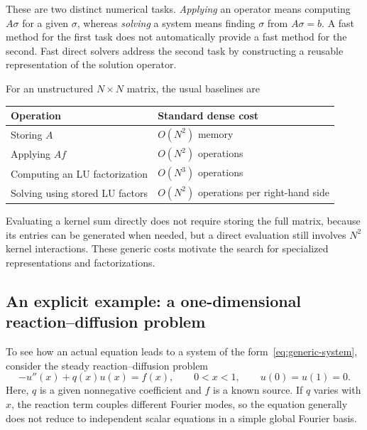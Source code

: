 These are two distinct numerical tasks. \emph{Applying} an operator means computing $A\sigma$ for a given $\sigma$, whereas \emph{solving} a system means finding $\sigma$ from $A\sigma=b$. A fast method for the first task does not automatically provide a fast method for the second. Fast direct solvers address the second task by constructing a reusable representation of the solution operator.

For an unstructured $N\times N$ matrix, the usual baselines are
\begin{center}
\begin{tabular}{@{}ll@{}}
Operation & Standard dense cost \\
\hline
Storing $A$ & $O(N^2)$ memory \\
Applying $Af$ & $O(N^2)$ operations \\
Computing an LU factorization & $O(N^3)$ operations \\
Solving using stored LU factors & $O(N^2)$ operations per right-hand side
\end{tabular}
\end{center}
Evaluating a kernel sum directly does not require storing the full matrix, because its entries can be generated when needed, but a direct evaluation still involves $N^2$ kernel interactions. These generic costs motivate the search for specialized representations and factorizations.

\subsection{An explicit example: a one-dimensional reaction--diffusion problem}
\label{subsec:reaction-diffusion}

To see how an actual equation leads to a system of the form~\eqref{eq:generic-system}, consider the steady reaction--diffusion problem
\begin{equation}
    -u''(x)+q(x)u(x)=f(x),\qquad 0<x<1,
    \qquad u(0)=u(1)=0.
    \label{eq:reaction-diffusion}
\end{equation}
Here, $q$ is a given nonnegative coefficient and $f$ is a known source. If $q$ varies with $x$, the reaction term couples different Fourier modes, so the equation generally does not reduce to independent scalar equations in a simple global Fourier basis.

